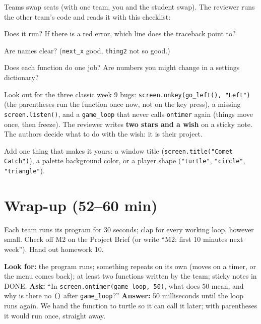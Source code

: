 \begin{bughunt}
Teams swap seats (with one team, you and the student swap). The reviewer runs the other team's code
and reads it with this checklist:
\begin{checklist}
  \item Does it run? If there is a red error, which line does the traceback point to?
  \item Are names clear? (\texttt{next\_x} good, \texttt{thing2} not so good.)
  \item Does each function do one job? Are numbers you might change in a settings dictionary?
\end{checklist}
Look out for the three classic week 9 bugs: \texttt{screen.onkey(go\_left(), "Left")} (the parentheses
run the function once now, not on the key press), a missing \texttt{screen.listen()}, and a
\texttt{game\_loop} that never calls \texttt{ontimer} again (things move once, then freeze).
The reviewer writes \textbf{two stars and a wish} on a sticky note. The authors decide what to do
with the wish: it is their project.
\end{bughunt}

\begin{freebuild}
Add one thing that makes it yours: a window title (\texttt{screen.title("Comet Catch")}), a palette
background color, or a player shape (\texttt{"turtle"}, \texttt{"circle"}, \texttt{"triangle"}).
\end{freebuild}

\section{Wrap-up (52--60 min)}
Each team runs its program for 30 seconds; clap for every working loop, however small. Check off M2 on
the Project Brief (or write \enquote{M2: first 10 minutes next week}). Hand out homework 10.

\begin{formativecheck}
\textbf{Look for:} the program runs; something repeats on its own (moves on a timer, or the menu comes
back); at least two functions written by the team; sticky notes in DONE.
\textbf{Ask:} “In \texttt{screen.ontimer(game\_loop, 50)}, what does 50 mean, and why is there no
\texttt{()} after \texttt{game\_loop}?”
\textbf{Answer:} 50 milliseconds until the loop runs again. We hand the function to turtle so it can
call it later; with parentheses it would run once, straight away.
\end{formativecheck}

